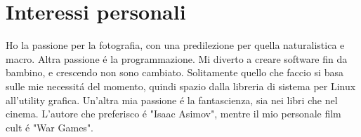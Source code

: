\section{Interessi personali}
Ho la passione per la fotografia, con una predilezione per quella naturalistica e
macro.\newline
Altra passione \'e la programmazione. Mi diverto a creare software fin da bambino,
e crescendo non sono cambiato. Solitamente quello che faccio si basa sulle mie
necessit\'a del momento, quindi spazio dalla libreria di sistema per Linux all'utility
grafica.\newline
Un'altra mia passione \'e la fantascienza, sia nei libri che nel cinema. L'autore che
preferisco \'e "Isaac Asimov", mentre il mio personale film cult \'e "War Games".
